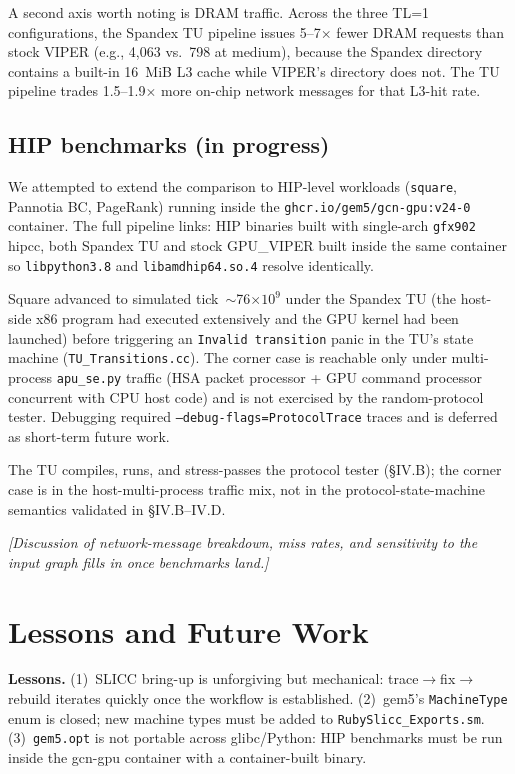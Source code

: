 \documentclass[conference,letterpaper,10pt]{IEEEtran}
\begin{document}
A second axis worth noting is DRAM traffic. Across the three TL=1
configurations, the Spandex TU pipeline issues 5--7$\times$ fewer DRAM
requests than stock VIPER (e.g., 4{,}063 vs.\ 798 at medium), because
the Spandex directory contains a built-in 16~MiB L3 cache while VIPER's
directory does not. The TU pipeline trades 1.5--1.9$\times$ more
on-chip network messages for that L3-hit rate.

\subsection{HIP benchmarks (in progress)}

We attempted to extend the comparison to HIP-level workloads
(\texttt{square}, Pannotia BC, PageRank) running inside the
\texttt{ghcr.io/gem5/gcn-gpu:v24-0} container. The full pipeline
links: HIP binaries built with single-arch \texttt{gfx902} hipcc, both
Spandex TU and stock GPU\_VIPER built inside the same container so
\texttt{libpython3.8} and \texttt{libamdhip64.so.4} resolve identically.

Square advanced to simulated tick~$\sim$76$\times 10^9$ under the
Spandex TU (the host-side x86 program had executed extensively and
the GPU kernel had been launched) before triggering an
\texttt{Invalid~transition} panic in the TU's state machine
(\texttt{TU\_Transitions.cc}). The corner case is reachable only
under multi-process \texttt{apu\_se.py} traffic (HSA packet
processor + GPU command processor concurrent with CPU host code) and
is not exercised by the random-protocol tester. Debugging required
\texttt{--debug-flags=ProtocolTrace} traces and is deferred as
short-term future work.

The TU compiles, runs, and stress-passes the protocol tester (§IV.B);
the corner case is in the host-multi-process traffic mix, not in the
protocol-state-machine semantics validated in §IV.B--IV.D.

\emph{[Discussion of network-message breakdown, miss rates, and
sensitivity to the input graph fills in once benchmarks land.]}

\section{Lessons and Future Work}

\textbf{Lessons.} (1)~SLICC bring-up is unforgiving but mechanical:
trace$\to$fix$\to$rebuild iterates quickly once the workflow is
established. (2)~gem5's \texttt{MachineType} enum is closed; new
machine types must be added to \texttt{RubySlicc\_Exports.sm}.
(3)~\texttt{gem5.opt} is not portable across glibc/Python: HIP
benchmarks must be run inside the gcn-gpu container with a
container-built binary.
\end{document}
